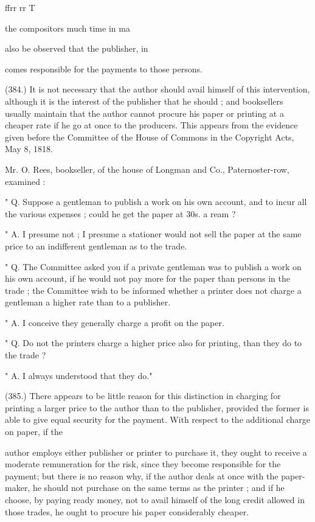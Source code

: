 \documentclass{article}
\begin{document}
ffrr rr T




the compositors much time in ma


also be observed that the publisher, in


comes responsible for the payments to those persons.


(384.) It is not necessary that the author should avail himself of this intervention, although it is the interest of the publisher that he should ; and booksellers usually maintain that the author cannot procure his paper or printing at a cheaper rate if he go at once to the producers. This appears from the evidence given before the Committee of the House of Commons in the Copyright Acts, May 8, 1818.


Mr. O. Rees, bookseller, of the house of Longman and Co., Paternoster-row, examined :


" Q. Suppose a gentleman to publish a work on his own account, and to incur all the various expenses ; could he get the paper at 30s. a ream ?


" A. I presume not ; I presume a stationer would not sell the paper at the same price to an indifferent gentleman as to the trade.


" Q. The Committee asked you if a private gentleman was to publish a work on his own account, if he would not pay more for the paper than persons in the trade ; the Committee wish to be informed whether a printer does not charge a gentleman a higher rate than to a publisher.


" A. I conceive they generally charge a profit on the paper.


" Q. Do not the printers charge a higher price also for printing, than they do to the trade ?


" A. I always understood that they do."


(385.) There appears to be little reason for this distinction in charging for printing a larger price to the author than to the publisher, provided the former is able to give equal security for the payment. With respect to the additional charge on paper, if the


author employs either publisher or printer to purchase it, they ought to receive a moderate remuneration for the risk, since they become responsible for the payment; but there is no reason why, if the author deals at once with the paper-maker, he should not purchase on the same terms as the printer ; and if he choose, by paying ready money, not to avail himself of the long credit allowed in those trades, he ought to procure his paper considerably cheaper.
\end{document}
